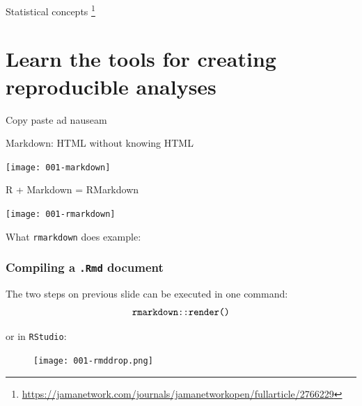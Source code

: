 \documentclass[10pt]{beamer}\usepackage[]{graphicx}\usepackage[]{color}
\begin{document}
\begin{frame}{Statistical concepts}
	\footnote{\tiny \url{https://jamanetwork.com/journals/jamanetworkopen/fullarticle/2766229}}
\end{frame}



\section{Learn the tools for creating reproducible analyses}


\begin{frame}{Copy paste ad nauseam}
\end{frame}


\begin{frame}{Markdown: HTML without knowing HTML}
	\begin{center}
		\texttt{[image: 001-markdown]}
	\end{center}
\end{frame}

\begin{frame}{R + Markdown = RMarkdown}
	\begin{center}
		\texttt{[image: 001-rmarkdown]}
	\end{center}
\end{frame}

\begin{frame}{What \texttt{rmarkdown} does}
	\textbf{} example:
	
	\begin{center}
	\end{center}
\end{frame}


\begin{frame}\frametitle{Compiling a \texttt{.Rmd} document}
	
	\begin{block}{The two steps on previous slide can be executed in one command:}
		\[ \textrm{\texttt{rmarkdown::render()}} \]
	\end{block}
	
	or in \texttt{RStudio}:
	\begin{figure}[h!]
		\centering
		\texttt{[image: 001-rmddrop.png]}
	\end{figure}
\end{frame}
\end{document}
